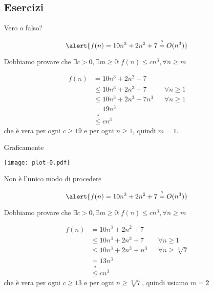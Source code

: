 \subsection{Esercizi}

\begin{frame}{Vero o falso?}

\begin{exampleblock}{}
\[
  \alert{f(n) = 10 n^3 + 2 n^2 + 7 \stackrel{?}{=} O(n^3)  }
\]
\end{exampleblock}

Dobbiamo provare che $\exists c>0, \exists m \geq 0: f(n) \leq cn^3, \forall n \geq m$

\begin{align*}
f(n) &=    10n^3 +2n^2 + 7 \\
     &\leq 10n^3 +2n^3 + 7 && \forall  n \geq 1\\
     &\leq 10n^3 +2n^3 + 7n^3 && \forall n \geq 1 \\
     &=    19n^3 \\
     &\stackrel{?}{\leq} cn^3
\end{align*}
che è vera per ogni $c \geq 19$ e per ogni $n \geq 1$, quindi $m=1$.
\end{frame}

\begin{frame}{Graficamente}

\begin{center}
\vspace{-12pt}
\texttt{[image: plot-0.pdf]}
\end{center}

\end{frame}

\begin{frame}{Non è l'unico modo di procedere}

\begin{exampleblock}{}
\[
  \alert{f(n) = 10 n^3 + 2 n^2 + 7 \stackrel{?}{=} O(n^3)}
\]
\end{exampleblock}

Dobbiamo provare che $\exists c>0, \exists m \geq 0: f(n) \leq cn^3, \forall n \geq m$

\begin{align*}
f(n) &=    10n^3 +2n^2 + 7 \\
     &\leq 10n^3 +2n^3 + 7 && \forall n \geq 1\\
     &\leq 10n^3 +2n^3 + n^3 && \forall n \geq \sqrt[3]{7}\\
     &=    13n^3 \\
     &\stackrel{?}{\leq} cn^3
\end{align*}
che è vera per ogni $c \geq 13$ e per ogni $n \geq \sqrt[3]{7}$, quindi usiamo $m=2$
\end{frame}

